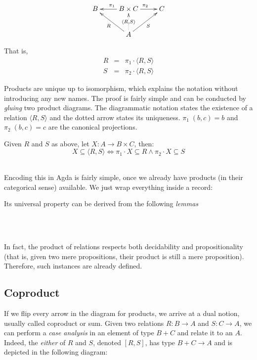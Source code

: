 \begin{displaymath}
\xymatrix{%
B & B \times C \ar[l]_{\pi_1} \ar[r]^{\pi_2} & C \\
  &     A \ar@{..>}[u]|{\langle R , S \rangle} \ar[ul]^{R} \ar[ur]_{S}
  &
}
\end{displaymath} 

That is,
\begin{eqnarray*}
  R &=& \pi_1 \cdot \langle R , S \rangle \\
  S &=& \pi_2 \cdot \langle R , S \rangle
\end{eqnarray*}

Products are unique up to isomorphism, which explains the notation without introducing any new names.
The proof is fairly simple and can be conducted by \emph{gluing} two product diagrams.
The diagrammatic notation states the existence of a relation $\langle R , S \rangle$ and the dotted arrow
states its uniqueness. $\pi_1\;(b , c) = b$ and $\pi_2\;(b , c) = c$ are the canonical
projections.\\

\begin{mydef}
Given $R$ and $S$ as above, let $X : A \rightarrow B \times C$, then:
\[
  X \subseteq \langle R , S \rangle \Leftrightarrow \pi_1 \cdot X \subseteq R \wedge \pi_2 \cdot X \subseteq S
\]\\
\end{mydef}
Encoding this in Agda is fairly simple, once we already have products (in their categorical sense)
available. We just wrap everything inside a record:


Its universal property can be derived from the following \emph{lemmas}

\\
\\

In fact, the product of relations respects both decidability and propositionality (that is,
given two mere propositions, their product is still a mere proposition). Therefore, such 
instances are already defined.

\subsection{Coproduct}

If we flip every arrow in the diagram for products, we arrive at a dual notion, usually
called coproduct or sum. Given two relations $R : B \rightarrow A$ and $S : C \rightarrow A$,
we can perform a \emph{case analysis} in an element of type $B + C$ and relate it to an $A$.
Indeed, the \emph{either} of $R$ and $S$, denoted $[R , S]$, has type $B + C \rightarrow A$
and is depicted in the following diagram:

